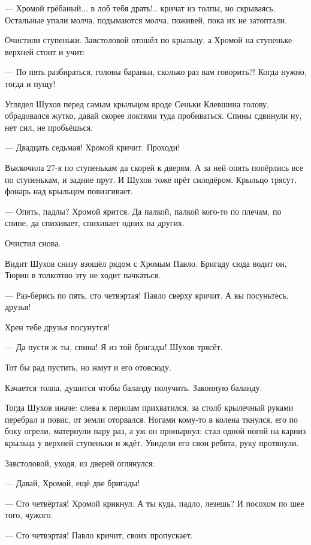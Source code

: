 --- Хромой грёбаный... в лоб тебя драть!.. \dash кричат из толпы, но скрываясь. Остальные упали
молча, подымаются молча, поживей, пока их не затоптали.

Очистили ступеньки. Завстоловой отошёл по крыльцу, а Хромой на ступеньке верхней стоит и
учит:

--- По пять разбираться, головы бараньи, сколько раз вам говорить?! Когда нужно, тогда и пущу!

Углядел Шухов перед самым крыльцом вроде Сеньки Клевшина голову, обрадовался жутко, давай
скорее локтями туда пробиваться. Спины сдвинули \dash ну, нет сил, не пробьёшься.

--- Двадцать седьмая! \dash Хромой кричит. \Dash Проходи!

Выскочила 27-я по ступенькам да скорей к дверям. А за ней опять попёрлись все по ступенькам, и
задние прут. И Шухов тоже прёт силодёром. Крыльцо трясут, фонарь над крыльцом повизгивает.

--- Опять, падлы? \dash Хромой ярится. Да палкой, палкой кого-то по плечам, по спине, да спихивает,
спихивает одних на других.

Очистил снова.

Видит Шухов снизу \dash взошёл рядом с Хромым Павло. Бригаду сюда водит он, Тюрин в толкотню эту
не ходит пачкаться.

--- Раз-берись по пять, сто четвэртая! \dash Павло сверху кричит. \Dash А вы посуньтесь, друзья!

Хрен тебе друзья посунутся!

--- Да пусти ж ты, спина! Я из той бригады! \dash Шухов трясёт.

Тот бы рад пустить, но жмут и его отовсюду.

Качается толпа, душится \dash чтобы баланду получить. Законную баланду.

Тогда Шухов иначе: слева к перилам прихватился, за столб крылечный руками перебрал и \dash
повис, от земли оторвался. Ногами кому-то в колена ткнулся, его по боку огрели, матернули пару
раз, а уж он пронырнул: стал одной ногой на карниз крыльца у верхней ступеньки и ждёт. Увидели
его свои ребята, руку протянули.

Завстоловой, уходя, из дверей оглянулся:

--- Давай, Хромой, ещё две бригады!

--- Сто четвёртая! \dash Хромой крикнул. \Dash А ты куда, падло, лезешь? \dash И посохом по шее того, чужого.

--- Сто четвэртая! \dash Павло кричит, своих пропускает.

